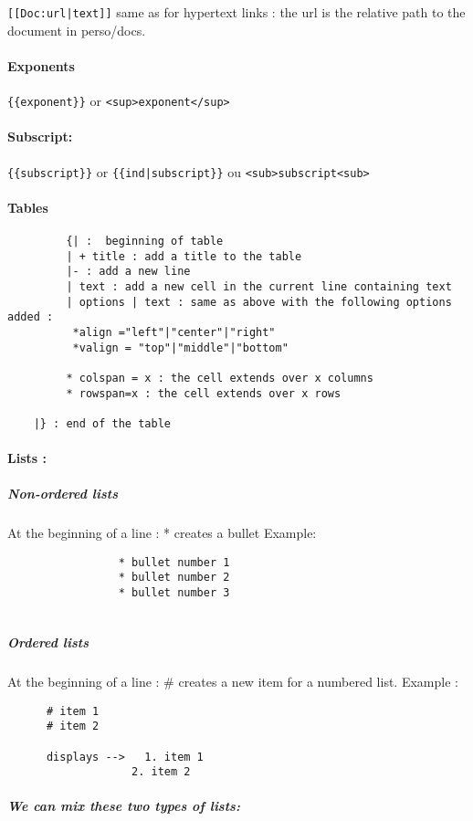 \documentclass{article}
\begin{document}
		\verb?[[Doc:url|text]]? same as for hypertext links : the url is the relative path to the document in perso/docs.
		
		

		
     \paragraph{Exponents} \verb|{{exponent}}| or
	  \verb|<sup>exponent</sup>|
     \paragraph{Subscript:} \verb|{{subscript}}| or \verb?{{ind|subscript}}? ou
	  \verb|<sub>subscript<sub>|
     \paragraph{Tables} 
         \begin{verbatim}
         {| :  beginning of table
         | + title : add a title to the table
         |- : add a new line
         | text : add a new cell in the current line containing text 
         | options | text : same as above with the following options added : 
          *align ="left"|"center"|"right"
          *valign = "top"|"middle"|"bottom"

         * colspan = x : the cell extends over x columns
         * rowspan=x : the cell extends over x rows

    |} : end of the table
	 \end{verbatim}
     \paragraph{Lists :} 

	
	\subparagraph{Non-ordered lists}
	At the beginning of a line : * creates a bullet	
     Example:
                 \begin{verbatim}
                 * bullet number 1
                 * bullet number 2
                 * bullet number 3
	
                  \end{verbatim}
                  \subparagraph{Ordered lists}
	At the beginning of a line : \# creates a new item for a numbered list. 
	Example : 
	  \begin{verbatim}
	  # item 1
	  # item 2
	  
	  displays -->   1. item 1
	               2. item 2
	  \end{verbatim}
		 \subparagraph{ We can mix these two types of lists:}
		       
\end{document}
